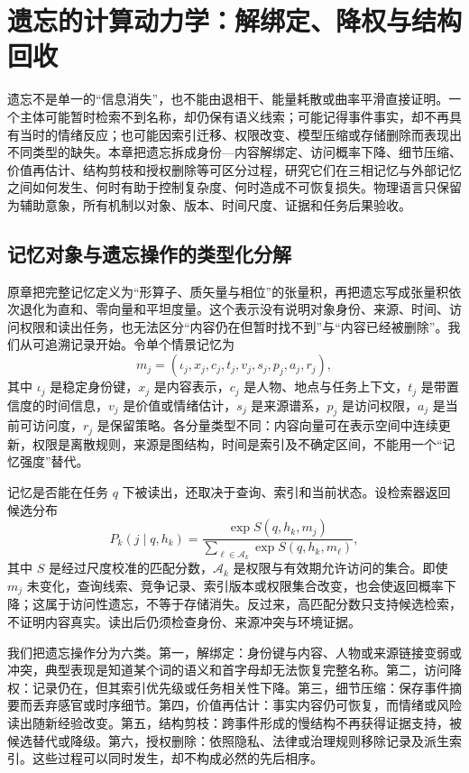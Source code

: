\chapter{遗忘的计算动力学：解绑定、降权与结构回收}
\label{chap:geometry_of_oblivion}
遗忘不是单一的“信息消失”，也不能由退相干、能量耗散或曲率平滑直接证明。一个主体可能暂时检索不到名称，却仍保有语义线索；可能记得事件事实，却不再具有当时的情绪反应；也可能因索引迁移、权限改变、模型压缩或存储删除而表现出不同类型的缺失。本章把遗忘拆成身份—内容解绑定、访问概率下降、细节压缩、价值再估计、结构剪枝和授权删除等可区分过程，研究它们在三相记忆与外部记忆之间如何发生、何时有助于控制复杂度、何时造成不可恢复损失。物理语言只保留为辅助意象，所有机制以对象、版本、时间尺度、证据和任务后果验收。

\section{记忆对象与遗忘操作的类型化分解}
\label{sec:tensor_definition_of_memory}
原章把完整记忆定义为“形算子、质矢量与相位”的张量积，再把遗忘写成张量积依次退化为直和、零向量和平坦度量。这个表示没有说明对象身份、来源、时间、访问权限和读出任务，也无法区分“内容仍在但暂时找不到”与“内容已经被删除”。我们从可追溯记录开始。令单个情景记忆为
\[
m_j=(\iota_j,x_j,c_j,t_j,v_j,s_j,p_j,a_j,r_j),
\]
其中 $\iota_j$ 是稳定身份键，$x_j$ 是内容表示，$c_j$ 是人物、地点与任务上下文，$t_j$ 是带置信度的时间信息，$v_j$ 是价值或情绪估计，$s_j$ 是来源谱系，$p_j$ 是访问权限，$a_j$ 是当前可访问度，$r_j$ 是保留策略。各分量类型不同：内容向量可在表示空间中连续更新，权限是离散规则，来源是图结构，时间是索引及不确定区间，不能用一个“记忆强度”替代。

记忆是否能在任务 $q$ 下被读出，还取决于查询、索引和当前状态。设检索器返回候选分布
\[
P_k(j\mid q,h_k)=\frac{\exp S(q,h_k,m_j)}{\sum_{\ell\in\mathcal A_k}\exp S(q,h_k,m_\ell)},
\]
其中 $S$ 是经过尺度校准的匹配分数，$\mathcal A_k$ 是权限与有效期允许访问的集合。即使 $m_j$ 未变化，查询线索、竞争记录、索引版本或权限集合改变，也会使返回概率下降；这属于访问性遗忘，不等于存储消失。反过来，高匹配分数只支持候选检索，不证明内容真实。读出后仍须检查身份、来源冲突与环境证据。

我们把遗忘操作分为六类。第一，解绑定：身份键与内容、人物或来源链接变弱或冲突，典型表现是知道某个词的语义和首字母却无法恢复完整名称。第二，访问降权：记录仍在，但其索引优先级或任务相关性下降。第三，细节压缩：保存事件摘要而丢弃感官或时序细节。第四，价值再估计：事实内容仍可恢复，而情绪或风险读出随新经验改变。第五，结构剪枝：跨事件形成的慢结构不再获得证据支持，被候选替代或降级。第六，授权删除：依照隐私、法律或治理规则移除记录及派生索引。这些过程可以同时发生，却不构成必然的先后相序。

